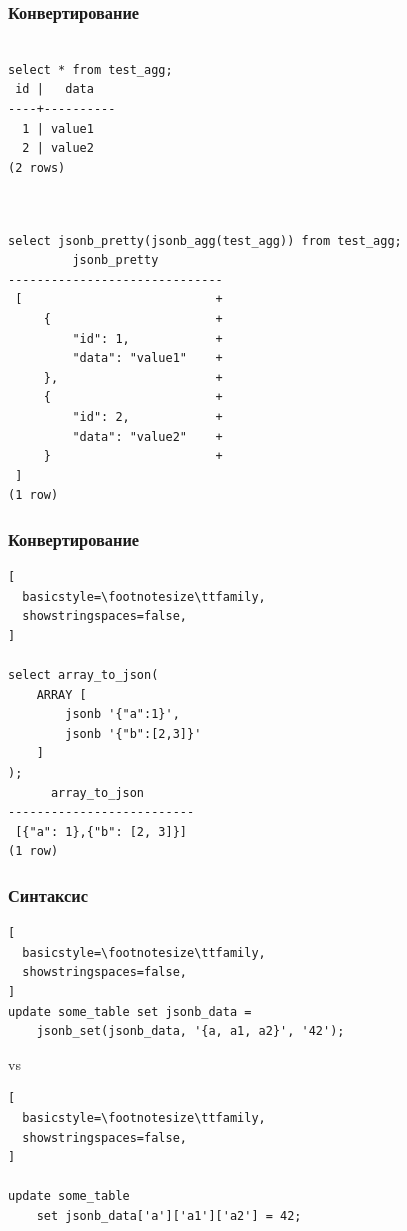 \documentclass[14pt, compress, aspectratio=169]{beamer}
\begin{document}
\begin{frame}[fragile]
  \frametitle{Конвертирование}

  \vspace{-20pt}
\begin{lstlisting}[]

select * from test_agg;
 id |   data   
----+----------
  1 | value1
  2 | value2
(2 rows)
         
\end{lstlisting}

\begin{lstlisting}[]

select jsonb_pretty(jsonb_agg(test_agg)) from test_agg;
         jsonb_pretty         
------------------------------
 [                           +
     {                       +
         "id": 1,            +
         "data": "value1"    +
     },                      +
     {                       +
         "id": 2,            +
         "data": "value2"    +
     }                       +
 ]
(1 row)

\end{lstlisting}

\end{frame}

\begin{frame}[fragile]
  \frametitle{Конвертирование}

\begin{lstlisting}[
  basicstyle=\footnotesize\ttfamily,
  showstringspaces=false,
]

select array_to_json(
    ARRAY [
        jsonb '{"a":1}',
        jsonb '{"b":[2,3]}'
    ]
);
      array_to_json       
--------------------------
 [{"a": 1},{"b": [2, 3]}]
(1 row)

\end{lstlisting}

\end{frame}

\begin{frame}[fragile]
  \frametitle{Синтаксис}

\begin{lstlisting}[
  basicstyle=\footnotesize\ttfamily,
  showstringspaces=false,
]
update some_table set jsonb_data =
    jsonb_set(jsonb_data, '{a, a1, a2}', '42');
\end{lstlisting}

vs

\begin{lstlisting}[
  basicstyle=\footnotesize\ttfamily,
  showstringspaces=false,
]

update some_table
    set jsonb_data['a']['a1']['a2'] = 42;

\end{lstlisting}

\end{frame}
\end{document}
